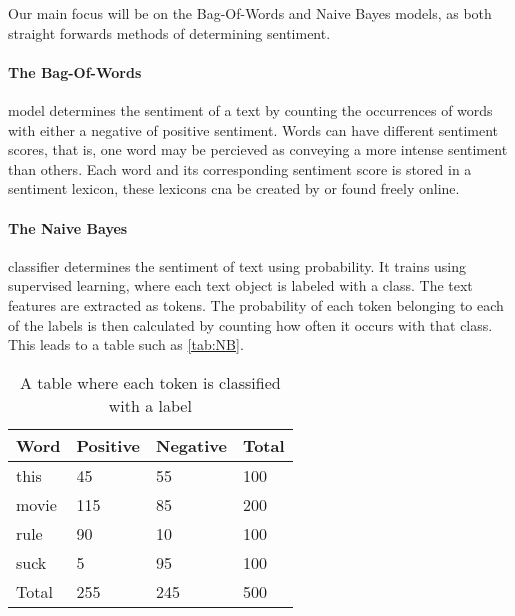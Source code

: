 
Our main focus will be on the Bag-Of-Words and Naive Bayes models, as both
straight forwards methods of determining sentiment.


\paragraph{The Bag-Of-Words} model determines the sentiment of a text by
counting the occurrences of words with either a negative of positive sentiment.
Words can have different sentiment scores, that is, one word may be percieved
as conveying a more intense sentiment than others. Each word and its
corresponding sentiment score is stored in a sentiment lexicon, these lexicons
cna be created by or found freely online\citep{BagOfWords}.

\paragraph{The Naive Bayes} classifier determines the sentiment of text using
probability. It trains using supervised learning, where each text object
is labeled with a class. The text features are extracted as tokens.
The probability of each token belonging to each of the labels is then
calculated by counting how often it occurs with that class. This leads to a
table such as \autoref{tab:NB}.

\begin{table}[H]
\centering
\begin{tabular}{|l|l|l|l|}
\hline
Word & Positive & Negative & Total 	\\ \hline
this & 45 & 55 & 100				\\ \hline
movie & 115 & 85 & 200				\\ \hline
rule & 90 & 10 & 100				\\ \hline
suck & 5 & 95 & 100					\\ \hline
Total & 255 & 245 & 500				\\ \hline
\end{tabular}
\caption{A table where each token is classified with a label}
\label{tab:NB}
\end{table}

